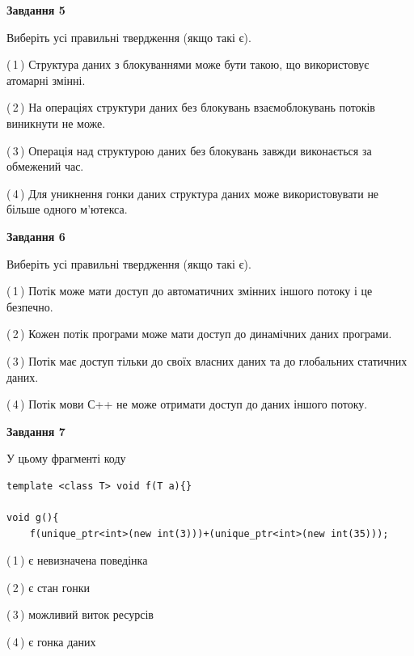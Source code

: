 \documentclass[12pt, ukrainian]{article}
\begin{document}
\begin {large}
{\begin{center}
\textbf{Завдання 5}
\end{center}

Виберіть усі правильні твердження (якщо такі є).\par
\vspace{2mm}

(\,1\,) Структура даних з блокуваннями може бути такою, що використовує атомарні змінні.%

(\,2\,) На операціях структури даних без блокувань взаємоблокувань потоків виникнути не може.%

(\,3\,) Операція над структурою даних без блокувань завжди виконається за обмежений час.%

(\,4\,) Для уникнення гонки даних структура даних може використовувати не більше одного м’ютекса.%
\newpage


\begin{center}
\textbf{Завдання 6}
\end{center}

Виберіть усі правильні твердження (якщо такі є).\par
\vspace{2mm}

(\,1\,) Потік може мати доступ до автоматичних змінних іншого потоку і це безпечно.%

(\,2\,) Кожен потік програми може мати доступ до динамічних даних програми.%

(\,3\,) Потік має доступ тільки до своїх власних даних та до глобальних статичних даних.%

(\,4\,) Потік мови С++ не може отримати доступ до даних іншого потоку.%


\begin{center}
\textbf{Завдання 7}
\end{center}

У цьому фрагменті коду
\begin{verbatim}
template <class T> void f(T a){}

void g(){
    f(unique_ptr<int>(new int(3)))+(unique_ptr<int>(new int(35)));
\end{verbatim}

(\,1\,) є невизначена поведінка%

(\,2\,) є стан гонки%

(\,3\,) можливий виток ресурсів%

(\,4\,) є гонка даних%

}
\end {large}

\vspace{4mm}
\newpage
\end{document}
